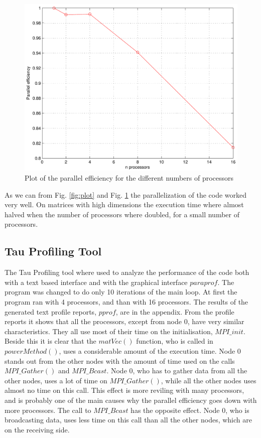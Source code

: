 \begin{figure}[h!] 
 \center 
 \includegraphics[scale=0.7]{./figures/plot2.pdf}
 \caption{  Plot of the parallel efficiency for the different numbers of processors\label{fig:para}}
 \end{figure}

As we can from Fig. \ref{fig:plot} and Fig. \ref{fig:para} the parallelization of the code worked very well. On matrices with high dimensions the execution time where almost halved when the number of processors where doubled, for a small number of processors. 

\subsection*{Tau Profiling Tool}
The Tau Profiling tool where used to analyze the performance of the code both with a text based interface and with the graphical interface $paraprof$. The program was changed to do only 10 iterations of the main loop. At first the program ran with 4 processors, and than with 16 processors. The results of the generated text profile reports, $pprof$, are in the appendix. From the profile reports it shows that all the processors, except from node 0, have very similar characteristics. They all use most of their time on the initialisation, $MPI\_init$. Beside this it is clear that the $matVec()$ function, who is called in $powerMethod()$, uses a considerable amount of the execution time. Node 0 stands out from the other nodes with the amount of time used on the calls $MPI\_Gather()$ and $MPI\_Bcast$. Node 0, who has to gather data from all the other nodes, uses a lot of time on $MPI\_Gather()$, while all the other nodes uses almost no time on this call. This effect is more reviling with many processors, and is probably one of the main causes why the parallel efficiency goes down with more processors. The call to $MPI\_Bcast$ has the opposite effect. Node 0, who is broadcasting data, uses less time on this call than all the other nodes, which are on the receiving side. 


